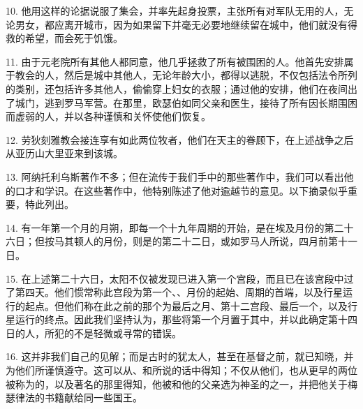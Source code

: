 10. 他用这样的论据说服了集会，并率先起身投票，主张所有对军队无用的人，无论男女，都应离开城市，因为如果留下并毫无必要地继续留在城中，他们就没有得救的希望，而会死于饥饿。\par

11. 由于元老院所有其他人都同意，他几乎拯救了所有被围困的人。他首先安排属于教会的人，然后是城中其他人，无论年龄大小，都得以逃脱，不仅包括法令所列的类别，还包括许多其他人，偷偷穿上妇女的衣服；通过他的安排，他们在夜间出了城门，逃到罗马军营。在那里，欧瑟伯如同父亲和医生，接待了所有因长期围困而虚弱的人，并以各种谨慎和关怀使他们恢复。\par

12. 劳狄刻雅教会接连享有如此两位牧者，他们在天主的眷顾下，在上述战争之后从亚历山大里亚来到该城。\par

13. 阿纳托利乌斯著作不多；但在流传于我们手中的那些著作中，我们可以看出他的口才和学识。在这些著作中，他特别陈述了他对逾越节的意见。以下摘录似乎重要，特此列出。\par

14. 有一年第一个月的月朔，即每一个十九年周期的开始，是在埃及月份的第二十六日；但按马其顿人的月份，则是的第二十二日，或如罗马人所说，四月前第十一日。\par

15. 在上述第二十六日，太阳不仅被发现已进入第一个宫段，而且已在该宫段中过了第四天。他们惯常称此宫段为第一个、、月份的起始、周期的首端，以及行星运行的起点。但他们称在此之前的那个为最后之月、第十二宫段、最后一个，以及行星运行的终点。因此我们坚持认为，那些将第一个月置于其中，并以此确定第十四日的人，所犯的不是轻微或寻常的错误。\par

16. 这并非我们自己的见解；而是古时的犹太人，甚至在基督之前，就已知晓，并为他们所谨慎遵守。这可以从、和所说的话中得知；不仅从他们，也从更早的两位被称为的，以及著名的那里得知，他被和他的父亲选为神圣的之一，并把他关于梅瑟律法的书籍献给同一些国王。\par

